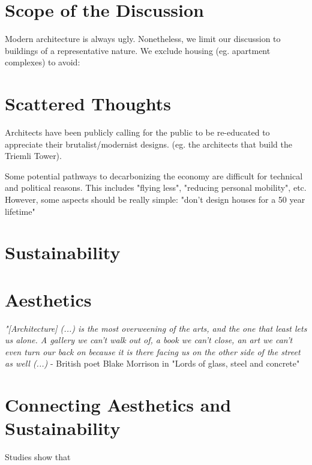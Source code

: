 \documentclass{article}
\begin{document}
\section{Scope of the Discussion}

Modern architecture is always ugly. Nonetheless, we limit our discussion to buildings of a representative nature. We exclude housing (eg. apartment complexes) to avoid:

\section{Scattered Thoughts}

Architects have been publicly calling for the public to be re-educated to appreciate their brutalist/modernist designs. (eg. the architects that build the Triemli Tower).

Some potential pathways to decarbonizing the economy are difficult for technical and political reasons. This includes "flying less", "reducing personal mobility", etc.
However, some aspects should be really simple: "don't design houses for a 50 year lifetime"

\section{Sustainability}

\section{Aesthetics}

\textit{"[Architecture] (...) is the most overweening of the arts, and the one that least lets us alone. A gallery we can't walk out of, a book we can't close, an art we can't even turn our back on because it is there facing us on the other side of the street as well (...)} - British poet Blake Morrison in "Lords of glass, steel and concrete" \cite{morrison_lords_1982}

\section{Connecting Aesthetics and Sustainability}



Studies show that 
\end{document}
